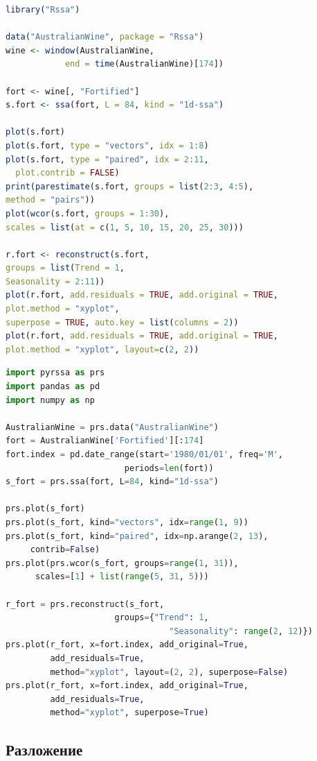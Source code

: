 \documentclass[specialist,
			   substylefile = spbu_report.rtx,
			   subf,href,colorlinks=true, 12pt]{disser}
\begin{document}
\begin{lstlisting}[language=R, caption=Программный код для визуализации разложения и восстановления ряда AustralianWine на языке R.]
library("Rssa")

data("AustralianWine", package = "Rssa")
wine <- window(AustralianWine, 
            end = time(AustralianWine)[174])

fort <- wine[, "Fortified"]
s.fort <- ssa(fort, L = 84, kind = "1d-ssa")

plot(s.fort)
plot(s.fort, type = "vectors", idx = 1:8)
plot(s.fort, type = "paired", idx = 2:11, 
  plot.contrib = FALSE)
print(parestimate(s.fort, groups = list(2:3, 4:5), 
method = "pairs"))
plot(wcor(s.fort, groups = 1:30),
scales = list(at = c(1, 5, 10, 15, 20, 25, 30)))

r.fort <- reconstruct(s.fort, 
groups = list(Trend = 1,
Seasonality = 2:11))
plot(r.fort, add.residuals = TRUE, add.original = TRUE,
plot.method = "xyplot",
superpose = TRUE, auto.key = list(columns = 2))
plot(r.fort, add.residuals = TRUE, add.original = TRUE,
plot.method = "xyplot", layout=c(2, 2))
\end{lstlisting}

\begin{lstlisting}[language=Python, caption=Программный код для визуализации разложения и восстановления ряда AustralianWine на языке Python.]
import pyrssa as prs
import pandas as pd
import numpy as np

AustralianWine = prs.data("AustralianWine")
fort = AustralianWine['Fortified'][:174]
fort.index = pd.date_range(start='1980/01/01', freq='M', 
                        periods=len(fort))
s_fort = prs.ssa(fort, L=84, kind="1d-ssa")

prs.plot(s_fort)
prs.plot(s_fort, kind="vectors", idx=range(1, 9))
prs.plot(s_fort, kind="paired", idx=np.arange(2, 13), 
	 contrib=False)
prs.plot(prs.wcor(s_fort, groups=range(1, 31)),
      scales=[1] + list(range(5, 31, 5)))

r_fort = prs.reconstruct(s_fort,
                      groups={"Trend": 1, 
                     	         "Seasonality": range(2, 12)})
prs.plot(r_fort, x=fort.index, add_original=True, 
         add_residuals=True,
         method="xyplot", layout=(2, 2), superpose=False)
prs.plot(r_fort, x=fort.index, add_original=True, 
         add_residuals=True,
         method="xyplot", superpose=True)
\end{lstlisting}

\subsection{Разложение}
\end{document}
